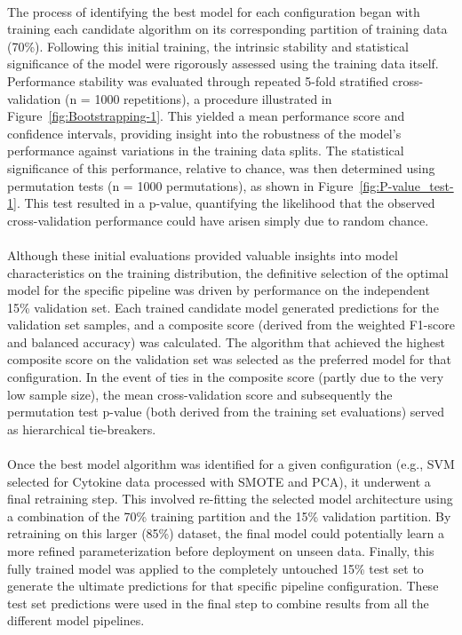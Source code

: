 \documentclass[12pt,a4paper]{report}
\begin{document}
\\
\noindent
The process of identifying the best model for each configuration began with training each candidate algorithm on its corresponding partition of training data (70\%). Following this initial training, the intrinsic stability and statistical significance of the model were rigorously assessed using the training data itself. Performance stability was evaluated through repeated 5-fold stratified cross-validation (n = 1000 repetitions), a procedure illustrated in Figure~\ref{fig:Bootstrapping-1}. This yielded a mean performance score and confidence intervals, providing insight into the robustness of the model's performance against variations in the training data splits. The statistical significance of this performance, relative to chance, was then determined using permutation tests (n = 1000 permutations), as shown in Figure~\ref{fig:P-value_test-1}. This test resulted in a p-value, quantifying the likelihood that the observed cross-validation performance could have arisen simply due to random chance.\\
\\
Although these initial evaluations provided valuable insights into model characteristics on the training distribution, the definitive selection of the optimal model for the specific pipeline was driven by performance on the independent 15\% validation set. Each trained candidate model generated predictions for the validation set samples, and a composite score (derived from the weighted F1-score and balanced accuracy) was calculated. The algorithm that achieved the highest composite score on the validation set was selected as the preferred model for that configuration. In the event of ties in the composite score (partly due to the very low sample size), the mean cross-validation score and subsequently the permutation test p-value (both derived from the training set evaluations) served as hierarchical tie-breakers.\\
\\
Once the best model algorithm was identified for a given configuration (e.g., SVM selected for Cytokine data processed with SMOTE and PCA), it underwent a final retraining step. This involved re-fitting the selected model architecture using a combination of the 70\% training partition and the 15\% validation partition. By retraining on this larger (85\%) dataset, the final model could potentially learn a more refined parameterization before deployment on unseen data. Finally, this fully trained model was applied to the completely untouched 15\% test set to generate the ultimate predictions for that specific pipeline configuration. These test set predictions were used in the final step to combine results from all the different model pipelines.\\
\end{document}
